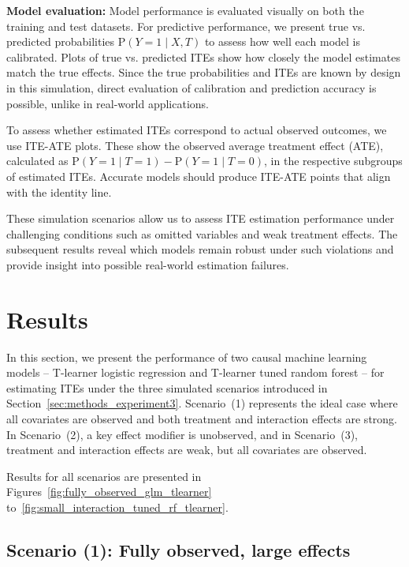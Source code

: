 \medskip

\textbf{Model evaluation:} Model performance is evaluated visually on both the training and test datasets. For predictive performance, we present true vs. predicted probabilities $\text{P}(Y = 1 \mid X, T)$ to assess how well each model is calibrated. Plots of true vs. predicted ITEs show how closely the model estimates match the true effects. Since the true probabilities and ITEs are known by design in this simulation, direct evaluation of calibration and prediction accuracy is possible, unlike in real-world applications.

To assess whether estimated ITEs correspond to actual observed outcomes, we use ITE-ATE plots. These show the observed average treatment effect (ATE), calculated as $\text{P}(Y = 1 \mid T = 1) - \text{P}(Y = 1 \mid T = 0)$, in the respective subgroups of estimated ITEs. Accurate models should produce ITE-ATE points that align with the identity line.

These simulation scenarios allow us to assess ITE estimation performance under challenging conditions such as omitted variables and weak treatment effects. The subsequent results reveal which models remain robust under such violations and provide insight into possible real-world estimation failures.




\section{Results} \label{sec:results_experiment3}

In this section, we present the performance of two causal machine learning models -- T-learner logistic regression and T-learner tuned random forest -- for estimating ITEs under the three simulated scenarios introduced in Section~\ref{sec:methods_experiment3}. Scenario~(1) represents the ideal case where all covariates are observed and both treatment and interaction effects are strong. In Scenario~(2), a key effect modifier is unobserved, and in Scenario~(3), treatment and interaction effects are weak, but all covariates are observed.

Results for all scenarios are presented in Figures~\ref{fig:fully_observed_glm_tlearner} to~\ref{fig:small_interaction_tuned_rf_tlearner}.



\subsection{Scenario (1): Fully observed, large effects}



